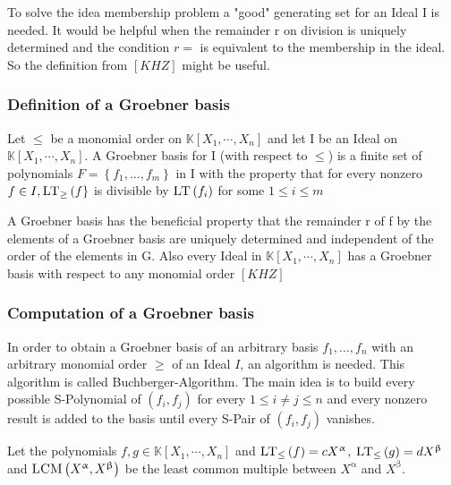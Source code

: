 To solve the idea membership problem a "good" generating set for an Ideal I is needed. It would be helpful when the remainder r on division is uniquely determined and the condition $ r = $ is equivalent to the membership in the ideal.
So the definition from $\left[KHZ \right]  $ might be useful.

\subsubsection{Definition of a Groebner basis}


\begin{env_definition}
Let $\leq$ be a monomial order on $\mathbb{K}\left[X_{1}, \cdots, X_{n}\right]$ and let I be an Ideal on $ \mathbb{K}\left[X_{1}, \cdots, X_{n}\right]  $. A Groebner basis for I (with respect to $\leq$) is a finite set of polynomials $ F = \left\lbrace f_{1}, \ldots , f_{m} \right\rbrace $ in I with the property that for every nonzero $ f \in I , \textsc{LT}_{\geq}\left( f\right\rbrace $ is divisible by $\textsc{LT}\left( f_{i}\right) $ for some $ 1 \leq i \leq m $

\end{env_definition}

A Groebner basis has the beneficial property that the remainder r of f by the elements of a Groebner basis are uniquely determined and independent of the order of the elements in G.
Also every Ideal in $\mathbb{K}\left[X_{1}, \cdots, X_{n}\right]$ has a Groebner basis with respect to any monomial order $\left[ KHZ\right] $

\subsubsection{Computation of a Groebner basis}

In order to obtain a Groebner basis of an arbitrary basis $f_{1}, \ldots , f_{n}$ with an arbitrary monomial order $\geq$ of an Ideal $I$, an algorithm is needed. This algorithm is called Buchberger-Algorithm. The main idea is to build every possible S-Polynomial of $\left( f_{i},f_{j}\right) $ for every $ 1 \leq i \neq j \leq n $ and every nonzero result is added to the basis until every S-Pair of $\left( f_{i},f_{j}\right) $ vanishes.

Let the polynomials $f,g \in \mathbb{K}\left[X_{1}, \cdots, X_{n}\right] $ and $\textsc{LT}_{\leq}\left(f \right) = cX^{\upalpha} $, $\textsc{LT}_{\leq}\left(g \right) = dX^{\upbeta} $ and $\textsc{LCM}\left( X^{\upalpha},X^{\upbeta}\right) $ be the least common multiple between $X^{\upalpha}$ and $X^{\upbeta}$. 

